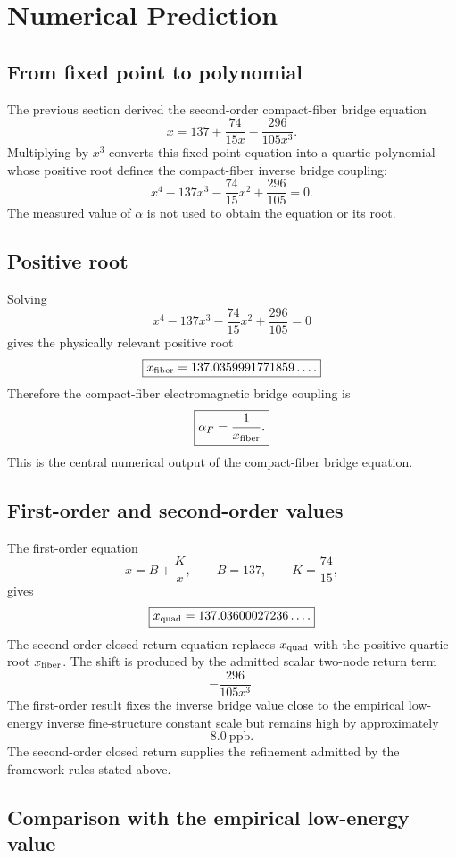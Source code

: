 \section{Numerical Prediction}

\subsection{From fixed point to polynomial}

The previous section derived the second-order compact-fiber bridge
equation
\[
x
=
137+\frac{74}{15x}
-
\frac{296}{105x^3}.
\]
Multiplying by \(x^3\) converts this fixed-point equation into a quartic
polynomial whose positive root defines the compact-fiber inverse bridge
coupling:
\[
\boxed{
x^4
-
137x^3
-
\frac{74}{15}x^2
+
\frac{296}{105}
=
0.
}
\]
The measured value of \(\alpha\) is not used to obtain the equation or
its root.

\subsection{Positive root}

Solving
\[
x^4
-
137x^3
-
\frac{74}{15}x^2
+
\frac{296}{105}
=
0
\]
gives the physically relevant positive root
\[
\boxed{
x_{\rm fiber}=137.0359991771859\ldots.
}
\]
Therefore the compact-fiber electromagnetic bridge coupling is
\[
\boxed{
\alpha_F
=
\frac1{x_{\rm fiber}}.
}
\]
This is the central numerical output of the compact-fiber bridge
equation.

\subsection{First-order and second-order values}

The first-order equation
\[
x=B+\frac{K}{x},
\qquad
B=137,
\qquad
K=\frac{74}{15},
\]
gives
\[
\boxed{
x_{\rm quad}=137.03600027236\ldots.
}
\]
The second-order closed-return equation replaces \(x_{\rm quad}\) with
the positive quartic root \(x_{\rm fiber}\). The shift is produced by
the admitted scalar two-node return term
\[
-\frac{296}{105x^3}.
\]
The first-order result fixes the inverse bridge value close to the
empirical low-energy inverse fine-structure constant scale but remains
high by approximately
\[
8.0\ \text{ppb}.
\]
The second-order closed return supplies the refinement admitted by the
framework rules stated above.

\subsection{Comparison with the empirical low-energy value}

